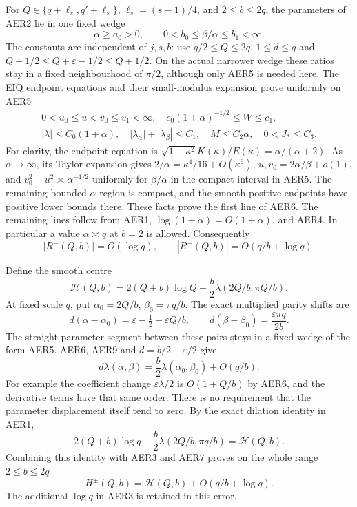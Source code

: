 \documentclass[11pt,a4paper]{article}
\begin{document}
For $Q\in\{q+\ell_s,q'+\ell_s\}$, $\ell_s=(s-1)/4$, and
$2\le b\le2q$, the parameters of AER2 lie in one fixed wedge
\[
 \alpha\ge a_0>0,\qquad
 0<b_0\le\beta/\alpha\le b_1<\infty.                  \tag{AER5}
\]
The constants are independent of $j,s,b$: use $q/2\le Q\le2q$,
$1\le d\le q$ and $Q-1/2\le Q+\varepsilon-1/2\le Q+1/2$.
On the actual narrower wedge these ratios stay in a fixed
neighbourhood of $\pi/2$, although only AER5 is needed here.
The EIQ endpoint equations and their small-modulus expansion prove
uniformly on AER5
\[
\begin{gathered}
 0<u_0\le u<v_0\le v_1<\infty,\quad
 c_0(1+\alpha)^{-1/2}\le W\le c_1,\\
 |\lambda|\le C_0(1+\alpha),\quad
 |\lambda_\alpha|+|\lambda_\beta|\le C_1,
 \quad M\le C_2\alpha,\quad 0<J_*\le C_3.
\end{gathered}\tag{AER6}
\]
For clarity, the endpoint equation is
$\sqrt{1-\kappa^2}K(\kappa)/E(\kappa)=\alpha/(\alpha+2)$.
As $\alpha\to\infty$, its Taylor expansion gives
$2/\alpha=\kappa^4/16+O(\kappa^6)$,
$u,v_0=2\alpha/\beta+o(1)$, and
$v_0^2-u^2\asymp\alpha^{-1/2}$ uniformly for
$\beta/\alpha$ in the compact interval in AER5.
The remaining bounded-$\alpha$ region is compact, and the smooth
positive endpoints have positive lower bounds there.  These facts
prove the first line of AER6.  The remaining lines follow from AER1,
$\log(1+\alpha)=O(1+\alpha)$, and AER4.  In particular a value
$\alpha\asymp q$ at $b=2$ is allowed.
Consequently
\[
 |R^-(Q,b)|=O(\log q),\qquad
 |R^+(Q,b)|=O(q/b+\log q).                             \tag{AER7}
\]

Define the smooth centre
\[
 \mathcal H(Q,b)=2(Q+b)\log Q
                 -\frac b2\lambda(2Q/b,\pi Q/b).       \tag{AER8}
\]
At fixed scale $q$, put $\alpha_0=2Q/b$, $\beta_0=\pi q/b$.
The exact multiplied parity shifts are
\[
 d(\alpha-\alpha_0)=\varepsilon-\tfrac12
                         +\varepsilon Q/b,\qquad
 d(\beta-\beta_0)=\frac{\varepsilon\pi q}{2b}.           \tag{AER9}
\]
The straight parameter segment between these pairs stays in a fixed
wedge of the form AER5.  AER6, AER9 and $d=b/2-\varepsilon/2$ give
\[
 d\lambda(\alpha,\beta)
        =\frac b2\lambda(\alpha_0,\beta_0)+O(q/b).
\]
For example the coefficient change $\varepsilon\lambda/2$ is
$O(1+Q/b)$ by AER6, and the derivative terms have that same order.
There is no requirement that the parameter displacement itself
tend to zero.  By the exact dilation identity in AER1,
\[
 2(Q+b)\log q-\frac b2\lambda(2Q/b,\pi q/b)
                       =\mathcal H(Q,b).
\]
Combining this identity with AER3 and AER7 proves on the whole range
$2\le b\le2q$
\[
 H^\pm(Q,b)=\mathcal H(Q,b)+O(q/b+\log q).              \tag{AER10}
\]
The additional $\log q$ in AER3 is retained in this error.
\end{document}
